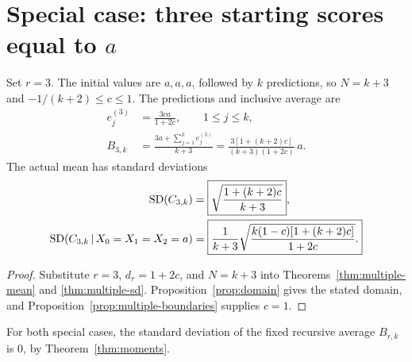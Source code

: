 \section{Special case: three starting scores equal to \texorpdfstring{\(a\)}{a}}
\begin{corollary}
\label{cor:three-starts}
Set \(r=3\). The initial values are \(a,a,a\), followed by \(k\)
predictions, so \(N=k+3\) and \(-1/(k+2)\leq c\leq1\). The predictions
and inclusive average are
\begin{align}
  e_j^{(3)}&=\boxed{\frac{3ca}{1+2c}},\qquad 1\leq j\leq k,
    \label{eq:three-predictions}\\
  B_{3,k}&=\frac{3a+\sum_{j=1}^{k}e_j^{(3)}}{k+3}
    =\boxed{\frac{3[1+(k+2)c]}{(k+3)(1+2c)}\,a.}
    \label{eq:three-mean}
\end{align}
The actual mean has standard deviations
\begin{align}
  \operatorname{SD}(C_{3,k})
    &=\boxed{\sqrt{\frac{1+(k+2)c}{k+3}}},
      \label{eq:three-population-sd}\\
  \operatorname{SD}(C_{3,k}\,\vert\, X_0=X_1=X_2=a)
    &=\boxed{\frac1{k+3}
       \sqrt{\frac{k(1-c)[1+(k+2)c]}{1+2c}}.}
      \label{eq:three-conditional-sd}
\end{align}
\end{corollary}
\begin{proof}
Substitute \(r=3\), \(d_r=1+2c\), and \(N=k+3\) into
Theorems~\ref{thm:multiple-mean} and \ref{thm:multiple-sd}.
Proposition~\ref{prop:domain} gives the stated domain, and
Proposition~\ref{prop:multiple-boundaries} supplies \(c=1\).
\end{proof}
For both special cases, the standard deviation of the fixed recursive
average \(B_{r,k}\) is \(0\), by Theorem~\ref{thm:moments}.

